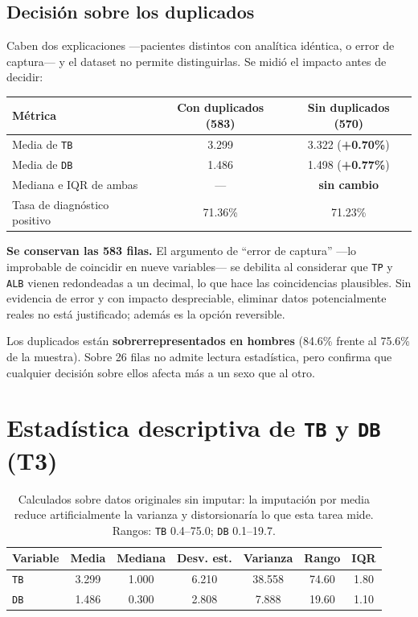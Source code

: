 \documentclass[10pt,a4paper]{article}
\begin{document}
\subsection{Decisión sobre los duplicados}

Caben dos explicaciones ---pacientes distintos con analítica idéntica, o error de captura--- y el dataset no permite distinguirlas. Se midió el impacto antes de decidir:

\begin{table}[H]
\footnotesize
\begin{tabularx}{\textwidth}{@{}X c c@{}}
\toprule
\textbf{Métrica} & \textbf{Con duplicados (583)} & \textbf{Sin duplicados (570)} \\
\midrule
Media de \texttt{TB} & 3.299 & 3.322 (\textbf{+0.70\%}) \\
Media de \texttt{DB} & 1.486 & 1.498 (\textbf{+0.77\%}) \\
Mediana e IQR de ambas & --- & \textbf{sin cambio} \\
Tasa de diagnóstico positivo & 71.36\% & 71.23\% \\
\bottomrule
\end{tabularx}
\end{table}

\textbf{Se conservan las 583 filas.} El argumento de ``error de captura'' ---lo improbable de coincidir en nueve variables--- se debilita al considerar que \texttt{TP} y \texttt{ALB} vienen redondeadas a un decimal, lo que hace las coincidencias plausibles. Sin evidencia de error y con impacto despreciable, eliminar datos potencialmente reales no está justificado; además es la opción reversible.

Los duplicados están \textbf{sobrerrepresentados en hombres} (84.6\% frente al 75.6\% de la muestra). Sobre 26 filas no admite lectura estadística, pero confirma que cualquier decisión sobre ellos afecta más a un sexo que al otro.

\section{Estadística descriptiva de \texttt{TB} y \texttt{DB} (T3)}

\begin{table}[H]
\footnotesize
\begin{tabularx}{\textwidth}{@{}l CCCCCC@{}}
\toprule
\textbf{Variable} & \textbf{Media} & \textbf{Mediana} & \textbf{Desv. est.} & \textbf{Varianza} & \textbf{Rango} & \textbf{IQR} \\
\midrule
\texttt{TB} & 3.299 & 1.000 & 6.210 & 38.558 & 74.60 & 1.80 \\
\texttt{DB} & 1.486 & 0.300 & 2.808 & 7.888 & 19.60 & 1.10 \\
\bottomrule
\end{tabularx}
\caption*{\footnotesize Calculados sobre datos originales sin imputar: la imputación por media reduce artificialmente la varianza y distorsionaría lo que esta tarea mide. Rangos: \texttt{TB} 0.4--75.0; \texttt{DB} 0.1--19.7.}
\end{table}
\end{document}
